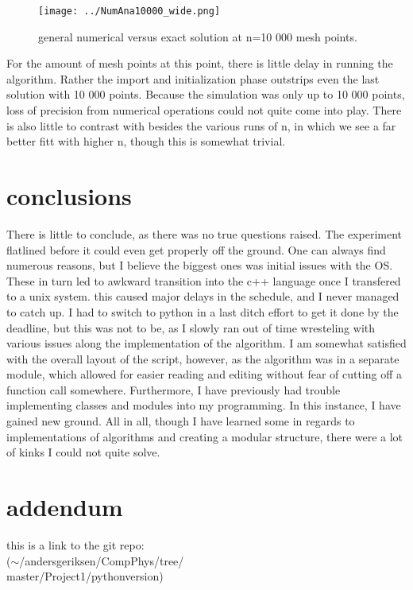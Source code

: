 \documentclass[10pt, twocolumn]{revtex4-1}
\begin{document}
\begin{figure}[hbtp]
\texttt{[image: ../NumAna10000\_wide.png]}
\caption{general numerical versus exact solution at n=10 000 mesh points.} 
\end{figure}
For the amount of mesh points at this point, there is little delay in running the algorithm. Rather the import and initialization phase outstrips even the last solution with 10 000 points. Because the simulation was only up to 10 000 points, loss of precision from numerical operations could not quite come into play. There is also little to contrast with besides the various runs of n, in which we see a far better fitt with higher n, though this is somewhat trivial. 

\section{conclusions}
There is little to conclude, as there was no true questions raised. The experiment flatlined before it could even get properly off the ground. One can always find numerous reasons, but I believe the biggest ones was initial issues with the OS. These in turn led to awkward transition into the c++ language once I transfered to a unix system. this caused major delays in the schedule, and I never managed to catch up. I had to switch to python in a last ditch effort to get it done by the deadline, but this was not to be, as I slowly ran out of time wresteling with various issues along the implementation of the algorithm. I am somewhat satisfied with the overall layout of the script, however, as the algorithm was in a separate module, which allowed for easier reading and editing without fear of cutting off a function call somewhere. Furthermore, I have previously had trouble implementing classes and modules into my programming. In this instance, I have gained new ground. All in all, though I have learned some in regards to implementations of algorithms and creating a modular structure, there were a lot of kinks I could not quite solve. 

\section{addendum}
this is a link to the git repo:\\
($\sim{}$/andersgeriksen/CompPhys/tree/\\
master/Project1/pythonversion)
\end{document}
